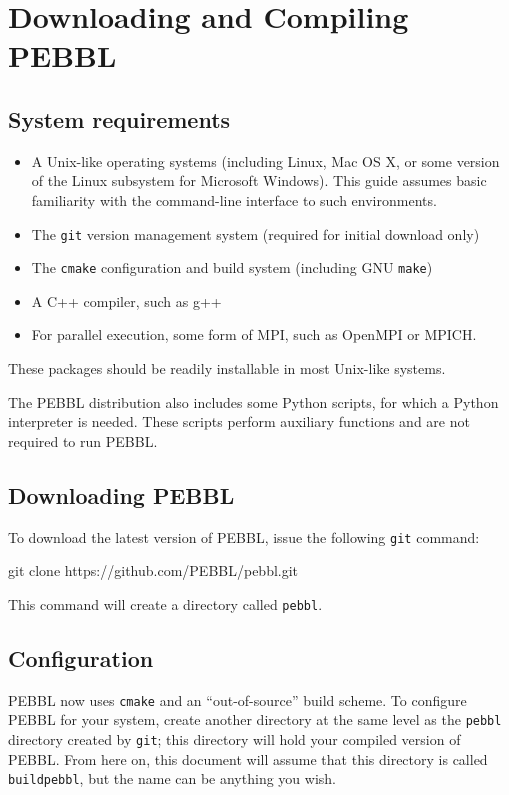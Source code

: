 \section{Downloading and Compiling PEBBL}
\label{sec:downloadcompile}

\subsection{System requirements}
\begin{itemize}
\item A Unix-like operating systems (including Linux, Mac OS X, or some
version of the Linux subsystem for Microsoft Windows).  This guide assumes
basic familiarity with the command-line interface to such environments.
\vspace{-1.8ex}
\item The \texttt{git} version management system (required for initial download only)
\vspace{-1.8ex}
\item The \texttt{cmake} configuration and build system (including GNU \texttt{make})
\vspace{-1.8ex}
\item A C++ compiler, such as g++
\vspace{-1.8ex}
\item For parallel execution, some form of MPI, such as OpenMPI or MPICH.
\end{itemize}
These packages should be readily installable in most Unix-like
systems.  

The PEBBL distribution also includes some Python scripts, for which a Python
interpreter is needed.  These scripts perform auxiliary functions and are not
required to run PEBBL.


\subsection{Downloading PEBBL}
To download the latest version of PEBBL, issue the following \texttt{git} command:
{\small
\begin{codeblock}
git clone https://github.com/PEBBL/pebbl.git
\end{codeblock}
}
\noindent This command will create a directory called
\texttt{pebbl}.  


\subsection{Configuration}
\label{sec:compile}
\label{sec:compiling}
PEBBL now uses \texttt{cmake} and an ``out-of-source'' build scheme.  To
configure PEBBL for your system, create another directory at the same level as
the \texttt{pebbl} directory created by \texttt{git}; this directory will hold
your compiled version of PEBBL.  From here on, this document will assume that
this directory is called \texttt{buildpebbl}, but the name can be anything you
wish.

